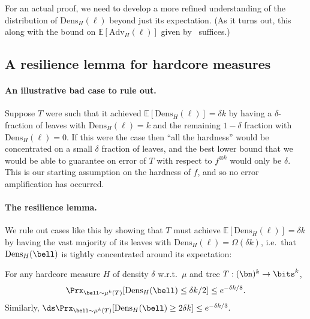 \documentclass[11pt]{article}
\newcommand{\Dens}{\mathrm{Dens}}
\begin{document}
For an actual proof, we need to develop a more refined understanding of the distribution of $\mathrm{Dens}_H(\boldsymbol{\ell})$ beyond just its expectation. (As it turns out, this along with the bound on $\mathbb{E}[\mathrm{Adv}_H(\boldsymbol{\ell})]$ given by~ suffices.) 

\subsection{A resilience lemma for hardcore measures}


\paragraph{An illustrative bad case to rule out.} Suppose $T$ were such that it achieved $\mathbb{E}[\mathrm{Dens}_H(\boldsymbol{\ell})] =  \delta k$ by having a $\delta$-fraction of leaves with $\mathrm{Dens}_H(\ell) = k$ and the remaining $1-\delta$ fraction with $\mathrm{Dens}_H(\ell) = 0$. If this were the case then “all the hardness” would be concentrated on a small $\delta$ fraction of leaves, and the best lower bound that we would be able to guarantee on error of $T$ with respect to $f^{\otimes k}$ would only be $\delta$. This is our starting assumption on the hardness of $f$, and so no error amplification has occurred. 

\paragraph{The resilience lemma.} We rule out cases like this by showing that $T$ must achieve $\mathbb{E}[\mathrm{Dens}_H(\boldsymbol{\ell})]=  \delta k$ by having the vast majority of its leaves with $\mathrm{Dens}_H(\ell) = \Omega(\delta k)$, i.e.~that $\Dens_H(\bell)$ is tightly concentrated around its expectation:  
\medskip 

\begin{tcolorbox}[colback = white,arc=1mm, boxrule=0.25mm]
\begin{lemma}
\label{lem:resilience lemma}
For any hardcore measure $H$ of density $\delta$ w.r.t.~$\mu$ and tree $T:(\bn)^k \to \bits^k$,
\begin{equation*}
    \Prx_{\bell \sim \mu^k(T)}[\Dens_H(\bell) \leq \delta k/2] \leq e^{-\delta k/8}.
\end{equation*}
Similarly, $\ds \Prx_{\bell \sim \mu^k(T)}[\Dens_H(\bell) \geq 2\delta k] \leq e^{-\delta k/3}.$ 
\end{lemma}
\end{tcolorbox}
\medskip 
\end{document}
